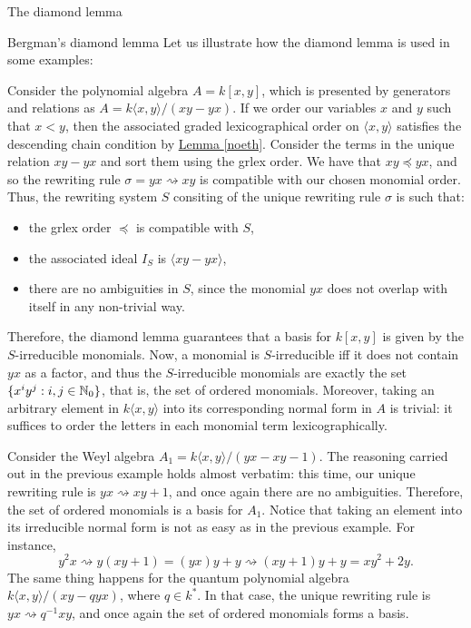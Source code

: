 \begin{chapter}{The diamond lemma}
\begin{section}{Bergman's diamond lemma}
Let us illustrate how the diamond lemma is used in some examples:

\begin{exmp} Consider the polynomial algebra $A=k[x,y]$, which is presented by generators and relations as $A=k\langle x,y\rangle/(xy-yx)$. If we order our variables $x$ and $y$ such that $x<y$, then the associated graded lexicographical order on $\langle x,y\rangle$ satisfies the descending chain condition by \hyperref[noeth]{Lemma \ref*{noeth}}. Consider the terms in the unique relation $xy-yx$ and sort them using the grlex order. We have that $xy\preceq yx$, and so the rewriting rule $\sigma=yx\rightsquigarrow xy$ is compatible with our chosen monomial order. Thus, the rewriting system $S$ consiting of the unique rewriting rule $\sigma$ is such that:
\begin{itemize}
\item the grlex order $\preceq$ is compatible with $S$,
\item the associated ideal $I_S$ is $\langle xy-yx\rangle$,
\item there are no ambiguities in $S$, since the monomial $yx$ does not overlap with itself in any non-trivial way.
\end{itemize}
Therefore, the diamond lemma guarantees that a basis for $k[x,y]$ is given by the $S$-irreducible monomials. Now, a monomial is $S$-irreducible iff it does not contain $yx$ as a factor, and thus the $S$-irreducible monomials are exactly the set $\{x^iy^j:i,j\in\mathbb{N}_0\}$, that is, the set of ordered monomials.
Moreover, taking an arbitrary element in $k\langle x,y\rangle$ into its corresponding normal form in $A$ is trivial: it suffices to order the letters in each monomial term lexicographically.
\end{exmp}
\begin{exmp} Consider the Weyl algebra $A_1 = k\langle x,y\rangle/(yx-xy-1)$. The reasoning carried out in the previous example holds almost verbatim: this time, our unique rewriting rule is $yx\rightsquigarrow xy + 1$, and once again there are no ambiguities. Therefore, the set of ordered monomials is a basis for $A_1$. Notice that taking an element into its irreducible normal form is not as easy as in the previous example. For instance, 
\[y^2x\rightsquigarrow y(xy+1) = (yx)y +y \rightsquigarrow (xy+1)y + y =xy^2 +2y.\]
The same thing happens for the quantum polynomial algebra $k\langle x,y\rangle/(xy-qyx)$, where $q\in k^*$. In that case, the unique rewriting rule is $yx\rightsquigarrow q^{-1}xy$, and once again the set of ordered monomials forms a basis.

\end{exmp}
\end{section}
\end{chapter}

